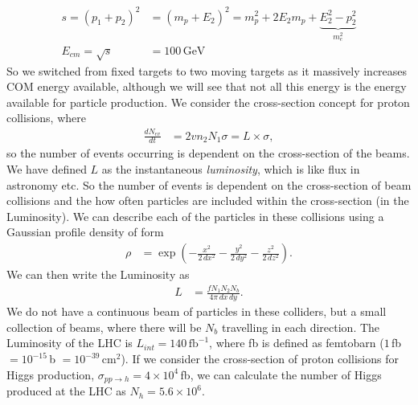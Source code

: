\documentclass[relqm.tex]{subfiles}
\begin{document}
\begin{align}
    s = (p_1+p_2)^2 &= (m_p+E_2)^2 = m_p^2 + 2E_2m_p + \underbrace{E_2^2-p_2^2}_{m_e^2} \\
    E_{cm} = \sqrt{s} &= 100\,\text{GeV}
\end{align}
So we switched from fixed targets to two moving targets as it massively increases COM energy available, although we will see that not all this energy is the energy available for particle production. 
We consider the cross-section concept for proton collisions, where
\begin{align}
    \frac{dN_{ev}}{dt} &= 2vn_2N_1\sigma = L\times\sigma,
\end{align}
so the number of events occurring is dependent on the cross-section of the beams.
We have defined $L$ as the instantaneous \emph{luminosity}, which is like flux in astronomy etc. 
So the number of events is dependent on the cross-section of beam collisions and the how often particles are included within the cross-section (in the Luminosity).
We can describe each of the particles in these collisions using a Gaussian profile density of form
\begin{align}
    \rho &= \exp\left(-\frac{x^2}{2\,dx^2}-\frac{y^2}{2\,dy^2}-\frac{z^2}{2\,dz^2}\right).
\end{align}
We can then write the Luminosity as
\begin{align}
    L &= \frac{fN_1N_2N_b}{4\pi\,dx\,dy}.
\end{align}
We do not have a continuous beam of particles in these colliders, but a small collection of beams, where there will be $N_b$ travelling in each direction.
The Luminosity of the LHC is $L_{int}=140\,\text{fb}^{-1}$, where fb is defined as femtobarn ($1\,$fb $=10^{-15}\,$b $=10^{-39}\,$cm$^2$).
If we consider the cross-section of proton collisions for Higgs production, $\sigma_{pp\to h}=4\times10^4\,$fb, we can calculate the number of Higgs produced at the LHC as $N_{h}=5.6\times10^6$.
\end{document}
